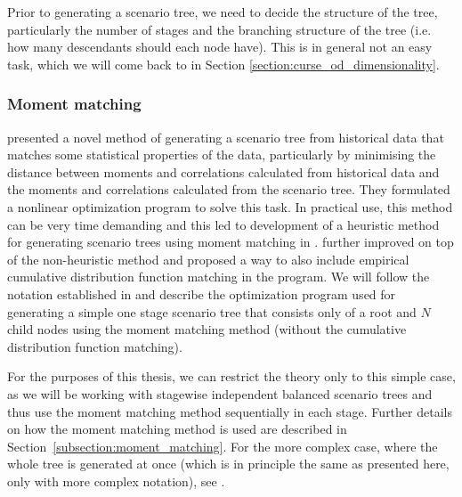 Prior to generating a scenario tree, we need to decide the structure of the tree, particularly the number of stages and the branching structure of the tree (i.e. how many descendants should each node have). This is in general not an easy task, which we will come back to in Section \ref{section:curse_od_dimensionality}.
\subsubsection{Moment matching}
\cite{hoyland_wallace_moment_matching} presented a novel method of generating a scenario tree from historical data that matches some statistical properties of the data, particularly by minimising the distance between moments and correlations calculated from historical data and the moments and correlations calculated from the scenario tree. They formulated a nonlinear optimization program to solve this task. In practical use, this method can be very time demanding and this led to development of a heuristic method for generating scenario trees using moment matching in \cite{hoyland_wallace_moment_matching_heuristic}.  \cite{moment_matching_agarwal} further improved on top of the non-heuristic method and proposed a way to also include empirical cumulative distribution function matching in the program. We will follow the notation established in \cite{moment_matching_agarwal} and describe the optimization program used for generating a simple one stage scenario tree that consists only of a root and $N$ child nodes using the moment matching method (without the cumulative distribution function matching).
\begin{rem}
For the purposes of this thesis, we can restrict the theory only to this simple case, as we will be working with stagewise independent balanced scenario trees and thus use the moment matching method sequentially in each stage. Further details on how the moment matching method is used are described in Section~\ref{subsection:moment_matching}. For the more complex case, where the whole tree is generated at once (which is in principle the same as presented here, only with more complex notation), see \cite{hoyland_wallace_moment_matching}.
\end{rem}

